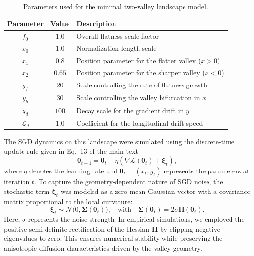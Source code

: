 \documentclass[aps,prx,preprint,superscriptaddress,nofootinbib]{revtex4-2}
\begin{document}
\begin{table}[h]
\centering
\caption{Parameters used for the minimal two-valley landscape model.}
\label{tab:parameters}
\renewcommand{\arraystretch}{1.2}
\begin{tabular}{ccl}
\hline
\textbf{Parameter} & \textbf{Value} & \textbf{Description} \\
\hline
$f_0$ & $1.0$ & Overall flatness scale factor \\
$x_0$ & $1.0$ & Normalization length scale \\
\hline
$x_1$ & $0.8$ & Position parameter for the flatter valley ($x > 0$) \\
$x_2$ & $0.65$ & Position parameter for the sharper valley ($x < 0$) \\
\hline
$y_f$ & $20$ & Scale controlling the rate of flatness growth \\
$y_b$ & $30$ & Scale controlling the valley bifurcation in $x$ \\
$y_d$ & $100$ & Decay scale for the gradient drift in $y$ \\
$\mathcal{L}_d$ & $1.0$ & Coefficient for the longitudinal drift speed \\
\hline
\end{tabular}
\end{table}

The SGD dynamics on this landscape were simulated using the discrete-time update rule given in Eq.~13 of the main text:
\begin{equation}
    \bm{\theta}_{t+1} = \bm{\theta}_t - \eta \left( \nabla \mathcal{L}(\bm{\theta}_t) + \bm{\xi}_t \right),
\end{equation}
where $\eta$ denotes the learning rate and $\bm{\theta}_t = (x_t, y_t)$ represents the parameters at iteration $t$. To capture the geometry-dependent nature of SGD noise, the stochastic term $\bm{\xi}_t$ was modeled as a zero-mean Gaussian vector with a covariance matrix proportional to the local curvature:
\begin{equation}
    \bm{\xi}_t \sim \mathcal{N}\bigl(0, \mathbf{\Sigma}(\bm{\theta}_t)\bigr), \quad \text{with} \quad \mathbf{\Sigma}(\bm{\theta}_t) = 2\sigma \mathbf{H}(\bm{\theta}_t).
\end{equation}
Here, $\sigma$ represents the noise strength. In empirical simulations, we employed the positive semi-definite rectification of the Hessian $\mathbf{H}$ by clipping negative eigenvalues to zero. This ensures numerical stability while preserving the anisotropic diffusion characteristics driven by the valley geometry.
\end{document}
